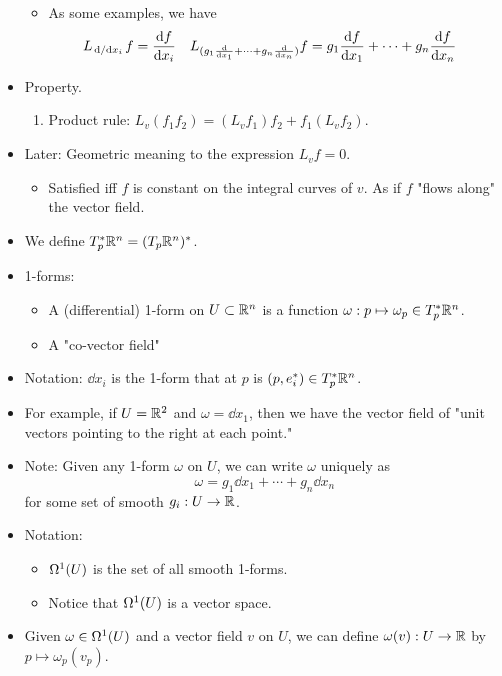\documentclass[../notes.tex]{subfiles}
\begin{document}
\begin{itemize}
\begin{itemize}
        \item As some examples, we have
        \begin{align*}
            L_{\dv*{x_i}}f &= \dv{f}{x_i}&
            L_{(g_1\dv{x_1}+\cdots+g_n\dv{x_n})}f &= g_1\dv{f}{x_1}+\cdots+g_n\dv{f}{x_n}
        \end{align*}
    \end{itemize}
    \item Property.
    \begin{enumerate}
        \item Product rule: $L_v(f_1f_2)=(L_vf_1)f_2+f_1(L_vf_2)$.
    \end{enumerate}
    \item Later: Geometric meaning to the expression $L_vf=0$.
    \begin{itemize}
        \item Satisfied iff $f$ is constant on the integral curves of $v$. As if $f$ "flows along" the vector field.
    \end{itemize}
    \item We define $T_p^*\R^n=(T_p\R^n)^*$.
    \item 1-forms:
    \begin{itemize}
        \item A (differential) 1-form on $U\subset\R^n$ is a function $\omega:p\mapsto\omega_p\in T_p^*\R^n$.
        \item A "co-vector field"
    \end{itemize}
    \item Notation: $\dd{x_i}$ is the 1-form that at $p$ is $(p,e_i^*)\in T_p^*\R^n$.
    \item For example, if $U=\R^2$ and $\omega=\dd{x_1}$, then we have the vector field of "unit vectors pointing to the right at each point."
    \item Note: Given any 1-form $\omega$ on $U$, we can write $\omega$ uniquely as
    \begin{equation*}
        \omega = g_1\dd{x_1}+\cdots+g_n\dd{x_n}
    \end{equation*}
    for some set of smooth $g_i:U\to\R$.
    \item Notation:
    \begin{itemize}
        \item $\ome[1]{U}$ is the set of all smooth 1-forms.
        \item Notice that $\ome[1]{U}$ is a vector space.
    \end{itemize}
    \item Given $\omega\in\ome[1]{U}$ and a vector field $v$ on $U$, we can define $\omega(v):U\to\R$ by $p\mapsto\omega_p(v_p)$.

\end{itemize}
\end{document}
